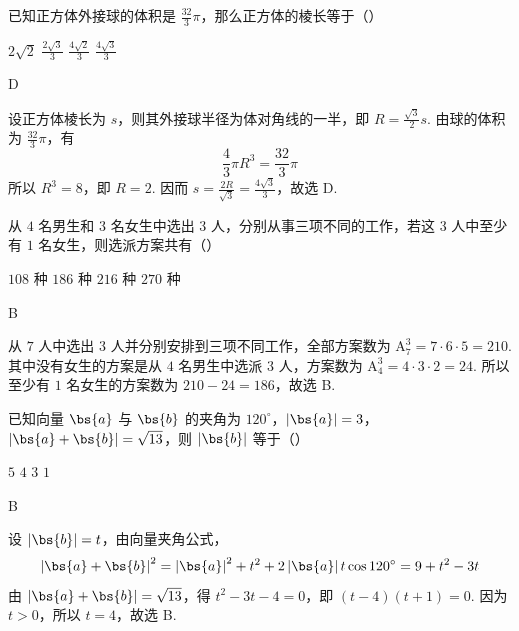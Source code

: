 \begin{problem}
已知正方体外接球的体积是 \(\frac{32}{3}\pi\)，那么正方体的棱长等于（\quad）

\choices
    {\(2\sqrt{2}\)}
    {\(\frac{2\sqrt{3}}{3}\)}
    {\(\frac{4\sqrt{2}}{3}\)}
    {\(\frac{4\sqrt{3}}{3}\)}
\end{problem}

\begin{answer}
D
\end{answer}

\begin{solution}
设正方体棱长为 \(s\)，则其外接球半径为体对角线的一半，即 \(R=\frac{\sqrt{3}}{2}s\). 由球的体积为 \(\frac{32}{3}\pi\)，有
\[
\frac{4}{3}\pi R^3=\frac{32}{3}\pi
\]
所以 \(R^3=8\)，即 \(R=2\). 因而 \(s=\frac{2R}{\sqrt{3}}=\frac{4\sqrt{3}}{3}\)，故选 D.
\end{solution}

\begin{problem}
从 \(4\) 名男生和 \(3\) 名女生中选出 \(3\) 人，分别从事三项不同的工作，若这 \(3\) 人中至少有 \(1\) 名女生，则选派方案共有（\quad）

\choices
    {\(108\) 种}
    {\(186\) 种}
    {\(216\) 种}
    {\(270\) 种}
\end{problem}

\begin{answer}
B
\end{answer}

\begin{solution}
从 \(7\) 人中选出 \(3\) 人并分别安排到三项不同工作，全部方案数为 \(\mathrm A_7^3=7\cdot6\cdot5=210\). 其中没有女生的方案是从 \(4\) 名男生中选派 \(3\) 人，方案数为 \(\mathrm A_4^3=4\cdot3\cdot2=24\). 所以至少有 \(1\) 名女生的方案数为
\(210-24=186\)，故选 B.
\end{solution}

\begin{problem}
已知向量 \(\bs{a}\) 与 \(\bs{b}\) 的夹角为 \(120^{\circ}\)，\(\left|\bs{a}\right| = 3\)，\(\left|\bs{a} + \bs{b}\right| = \sqrt{13}\)，则 \(\left|\bs{b}\right|\) 等于（\quad）

\choices
    {\(5\)}
    {\(4\)}
    {\(3\)}
    {\(1\)}
\end{problem}

\begin{answer}
B
\end{answer}

\begin{solution}
设 \(\left|\bs{b}\right|=t\)，由向量夹角公式，
\[
\left|\bs{a}+\bs{b}\right|^2=\left|\bs{a}\right|^2+t^2+2\left|\bs{a}\right|t\cos120^{\circ}=9+t^2-3t
\]
由 \(\left|\bs{a}+\bs{b}\right|=\sqrt{13}\)，得 \(t^2-3t-4=0\)，即 \((t-4)(t+1)=0\). 因为 \(t>0\)，所以 \(t=4\)，故选 B.
\end{solution}

